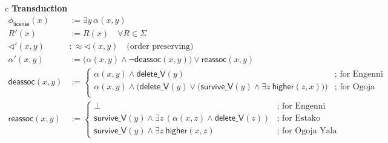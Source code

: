 \begin{table}
\vspace{-1em}
\footnotesize
\begin{tabular}{c}
\toprule
\textbf{Transduction} \\
\midrule
\(
\begin{aligned}
\phi_{\textsf{license}}(x) 
  &:= \exists y\, \alpha(x,y) \\

R'(x) 
  &:= R(x) \quad \forall R \in \Sigma \\

\lhd'(x,y) 
  &:\approx \lhd(x,y) \quad\textrm{(order preserving)}\\


\alpha'(x,y) 
  &:= \bigl(\alpha(x,y)\land \neg \textsf{deassoc}(x,y)\bigr) \lor \textsf{reassoc}(x,y) \\

\textsf{deassoc}(x,y) 
  &:= 
    \begin{cases}
	 \alpha(x,y)\land \textsf{delete\_V}(y)     
	 &\text{; for Engenni \& Estako} \\
	 \alpha(x,y)\land \big(\textsf{delete\_V}(y) \lor \big(\textsf{survive\_V}(y) \land \exists z \ \textsf{higher}(z,x))\big)
	 	 &\text{; for Ogoja Yala} \\
    \end{cases}
\\
\textsf{reassoc}(x,y) 
  &:=
  \begin{cases}
    \bot
    & \text{; for Engenni} \\

    \textsf{survive\_V}(y)\land
    \exists z\,(\alpha(x,z)\land \textsf{delete\_V}(z))
    & \text{; for Estako} \\

    \textsf{survive\_V}(y)\land
\exists z \ \textsf{higher}(x,z)    & \text{; for Ogoja Yala}
  \end{cases}
\end{aligned}
\)
\\
\bottomrule
\end{tabular}
\vspace{-.5em}
\caption{}
\label{tab.transduction}
\vspace{-2em}
\end{table}
